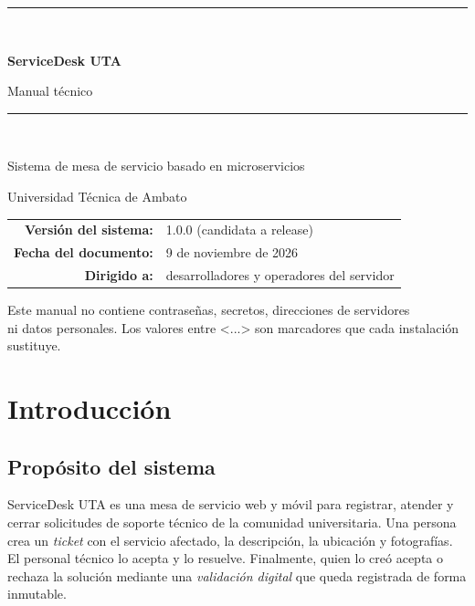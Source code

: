 \documentclass[11pt,a4paper,oneside]{report}
\newcommand{\codus}{\textunderscore\allowbreak}
\DeclareRobustCommand{\cod}[1]{{\small\ttfamily\let\_\codus #1}}
\begin{document}
\begin{titlepage}
  \centering
  \vspace*{2.5cm}
  {\color{utaRojo}\rule{\linewidth}{1.2pt}}\\[14pt]
  {\Huge\bfseries ServiceDesk UTA\par}
  \vspace{8pt}
  {\LARGE Manual técnico\par}
  \vspace{6pt}
  {\color{utaRojo}\rule{\linewidth}{1.2pt}}\\[30pt]
  {\large Sistema de mesa de servicio basado en microservicios\par}
  \vspace{4pt}
  {\large Universidad Técnica de Ambato\par}
  \vfill
  \begin{tabular}{rl}
    \textbf{Versión del sistema:} & 1.0.0 (candidata a release) \\
    \textbf{Fecha del documento:} & 9 de noviembre de 2026 \\
    \textbf{Dirigido a:} & desarrolladores y operadores del servidor \\
  \end{tabular}
  \vspace{2cm}

  {\small\color{gris}Este manual no contiene contraseñas, secretos, direcciones de servidores\\
  ni datos personales. Los valores entre \cod{<...>} son marcadores que cada instalación sustituye.\par}
\end{titlepage}

\tableofcontents
\clearpage
{}

\chapter{Introducción}

\section{Propósito del sistema}
ServiceDesk UTA es una mesa de servicio web y móvil para registrar, atender y cerrar
solicitudes de soporte técnico de la comunidad universitaria. Una persona crea un
\emph{ticket} con el servicio afectado, la descripción, la ubicación y fotografías.
El personal técnico lo acepta y lo resuelve. Finalmente, quien lo creó acepta o rechaza la solución
mediante una \emph{validación digital} que queda registrada de forma inmutable.
\end{document}
